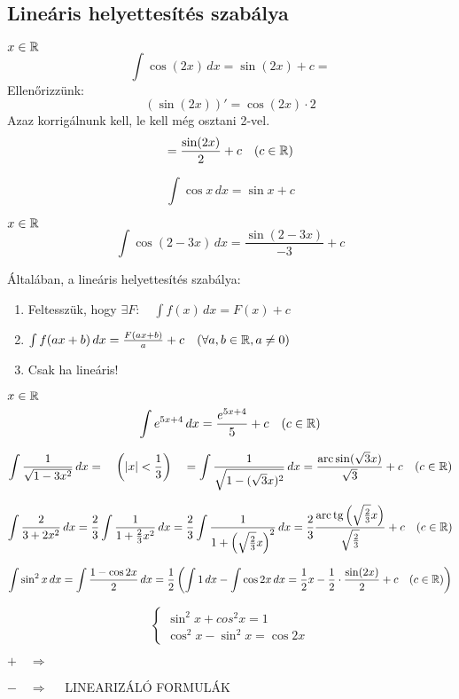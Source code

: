 \documentclass[a4paper,11.5pt]{article}
\DeclareMathOperator{\tg}{tg}
\DeclareMathOperator{\arc}{arc}
\begin{document}
	\subsection{Lineáris helyettesítés szabálya}
	\begin{task}$x\in\mathbb{R}$
		\[ \int\cos(2x)\,dx=\sin(2x)+c= \]
		Ellenőrizzünk:
		\[ (\sin(2x))'=\cos(2x)\cdot2 \]
		Azaz korrigálnunk kell, le kell még osztani 2-vel.
		\[ =\frac{\sin(2x)}{2}+c\quad (c\in\mathbb{R}) \]
	\end{task}
	\begin{revision}
		\[ \int\cos x\,dx=\sin x+c \]
	\end{revision}
	\begin{task}$x\in\mathbb{R}$
		\[ \int\cos(2-3x)\,dx=\frac{\sin(2-3x)}{-3}+c \]
	\end{task}
	Általában, a lineáris helyettesítés szabálya:
	\begin{enumerate}
		\item Feltesszük, hogy $\exists F:\quad \int f(x)\,dx=F(x)+c$
		\item $\int f(ax+b)\,dx=\frac{F(ax+b)}{a}+c\quad (\forall a,b\in\mathbb{R}, a\not=0)$
		\item Csak ha lineáris!
	\end{enumerate}
	\begin{task}$x\in\mathbb{R}$
		\[ \int e^{5x+4}\,dx=\frac{e^{5x+4}}{5}+c\quad (c\in\mathbb{R}) \]
	\end{task}
	\begin{task}
		\[ \int\frac{1}{\sqrt{1-3x^2}}\,dx=\quad \left(|x|<\frac{1}{3}\right) \quad =\int\frac{1}{\sqrt{1-(\sqrt{3}x)^2}}\,dx=\frac{\arc\sin(\sqrt{3}x)}{\sqrt{3}}+c\quad (c\in\R) \]
	\end{task}
	\begin{task}
		\[ \int\frac{2}{3+2x^2}\,dx=\frac{2}{3}\int\frac{1}{1+\frac{2}{3}x^2}\,dx=\frac{2}{3}\int\frac{1}{1+\left(\sqrt{\frac{2}{3}}x\right)^2}\,dx=\frac{2}{3}\frac{\arc\tg\left(\sqrt{\frac{2}{3}}x\right)}{\sqrt{\frac{2}{3}}}+c\quad (c\in\R) \]
	\end{task}
	\begin{task}
		\[\int\sin^2x\,dx=\int\frac{1-\cos2x}{2}\,dx=\frac{1}{2}\left(\int1\,dx-\int\cos2x\,dx=\frac{1}{2}x-\frac{1}{2}\cdot\frac{\sin(2x)}{2}+c\quad (c\in\mathbb{R})\right) \]
	\end{task}
	\begin{note}
		\[ \begin{cases}
		\sin^2x+cos^2x=1\\
		\cos^2x-\sin^2x=\cos2x
		\end{cases} \]
		\begin{center}
			$+\quad \Rightarrow\quad $\quad {}
			
			$-\quad \Rightarrow\quad $ LINEARIZÁLÓ FORMULÁK
		\end{center}
	\end{note}
\end{document}
